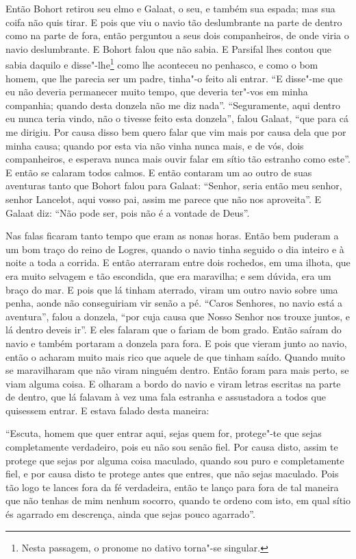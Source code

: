 Então Bohort retirou seu elmo e Galaat, o seu, e também sua espada; mas sua
coifa não quis tirar. E pois que viu o navio tão deslumbrante na parte de
dentro como na parte de fora, então perguntou a seus dois companheiros, de onde
viria o navio deslumbrante. E Bohort falou que não sabia. E Parsifal lhes
contou que sabia daquilo e disse"-lhe\footnote{ Nesta passagem, o pronome no
dativo  torna"-se singular.}  como lhe aconteceu no
penhasco, e como o bom homem, que lhe parecia ser um padre, tinha"-o feito ali
entrar. “E disse"-me que eu não deveria permanecer muito tempo, que deveria
ter"-vos em minha companhia; quando desta donzela não me diz nada”.
“Seguramente, aqui dentro eu nunca teria vindo, não o tivesse feito esta
donzela”, falou Galaat, “que para cá me dirigiu. Por causa disso bem quero
falar que vim mais por causa dela que por minha causa; quando por esta via não
vinha nunca mais, e de vós, dois companheiros, e esperava nunca mais ouvir
falar em sítio tão estranho como este”. E então se calaram todos calmos. E
então contaram um ao outro de suas aventuras tanto que Bohort falou para
Galaat: “Senhor, seria então meu senhor, senhor Lancelot, aqui vosso pai,
assim me parece que não nos aproveita”. E Galaat diz: “Não pode ser, pois não é
a vontade de Deus”. 

Nas falas ficaram tanto tempo que eram as nonas horas. Então bem puderam a um
bom traço do reino de Logres, quando o navio tinha seguido o dia inteiro e à
noite a toda a corrida. E então aterraram entre dois rochedos, em uma ilhota,
que era muito selvagem e tão escondida, que era maravilha; e sem dúvida, era um
braço do mar. E pois que lá tinham aterrado, viram um outro navio sobre uma
penha, aonde não conseguiriam vir senão a pé. “Caros Senhores, no navio está a
aventura”, falou a donzela, “por cuja causa que Nosso Senhor nos trouxe juntos,
e lá dentro deveis ir”. E eles falaram que o fariam de bom grado. Então saíram
do navio e também portaram a donzela para fora. E pois que vieram junto ao
navio, então o acharam muito mais rico que aquele de que tinham saído. Quando
muito se maravilharam que não viram ninguém dentro. Então foram para mais
perto, se viam alguma coisa. E olharam a bordo do navio e viram letras escritas
na parte de dentro, que lá falavam à vez uma fala estranha e assustadora a
todos que quisessem entrar. E estava falado desta maneira:

“Escuta, homem que quer entrar aqui, sejas quem for, protege"-te que sejas
completamente verdadeiro, pois eu não sou senão fiel. Por causa disto, assim te
protege que sejas por alguma coisa maculado, quando sou puro e completamente
fiel, e por causa disto te protege antes que entres, que não sejas maculado.
Pois tão logo te lances fora da fé verdadeira, então te lanço para fora de tal
maneira que não tenhas de mim nenhum socorro, quando te ordeno com isto, em
qual sítio és agarrado em descrença, ainda que sejas pouco agarrado”.

